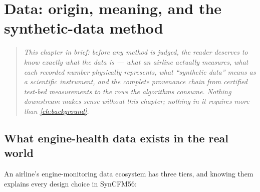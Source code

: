 \chapter{Data: origin, meaning, and the synthetic-data method}
\label{ch:data}

\begin{quote}\itshape
This chapter in brief: before any method is judged, the reader deserves to know exactly
what the data \emph{is} --- what an airline actually measures, what each recorded number
physically represents, what ``synthetic data'' means as a scientific instrument, and the
complete provenance chain from certified test-bed measurements to the rows the algorithms
consume. Nothing downstream makes sense without this chapter; nothing in it requires more
than \cref{ch:background}.
\end{quote}



\section{What engine-health data exists in the real world}
\label{sec:real-data}

An airline's engine-monitoring data ecosystem has three tiers, and knowing them explains
every design choice in SynCFM56:

